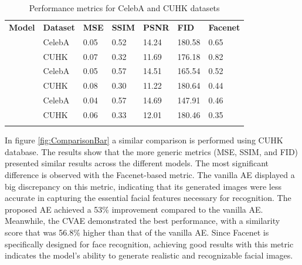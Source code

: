 \documentclass{IEEEcsmag}
\begin{document}
\begin{table}
\vspace*{4pt}
\caption{Performance metrics for CelebA and CUHK datasets}
\label{tab:similarity}
\tablefont
\begin{tabular*}{\textwidth}{@{}l p{40pt}<{\raggedright} p{40pt}<{\centering} p{40pt}<{\centering} p{40pt}<{\centering} p{40pt}<{\centering} p{40pt}<{\centering}@{}}
\toprule
\textbf{Model} & 
\textbf{Dataset} & 
\textbf{MSE} & 
\textbf{SSIM} & 
\textbf{PSNR} & 
\textbf{FID} & 
\textbf{Facenet} \\
\colrule
\multirow{2}{*}{Vanilla AE} 
& CelebA & 0.05 & 0.52 & 14.24 & 180.58 & 0.65 \\[3pt]
& CUHK   & 0.07 & 0.32 & 11.69 & 176.18 & 0.82 \\[3pt]
\colrule
\multirow{2}{*}{Proposed AE}
& CelebA & 0.05 & 0.57 & 14.51 & 165.54 & 0.52 \\[3pt]
& CUHK   & 0.08 & 0.30 & 11.22 & 180.64 & 0.44 \\[3pt]
\colrule
\multirow{2}{*}{Proposed CVAE} 
& CelebA & 0.04 & 0.57 & 14.69 & 147.91 & 0.46 \\[3pt]
& CUHK   & 0.06 & 0.33 & 12.01 & 180.46 & 0.35 \\[3pt]
\botrule
\end{tabular*}
\vspace*{8pt}
\end{table}

In figure \ref{fig:ComparisonBar} a similar comparison is performed using CUHK database. The results show that the more generic metrics (MSE, SSIM, and FID) presented similar results across the different models. The most significant difference is observed with the Facenet-based metric. The vanilla AE displayed a big discrepancy on this metric, indicating that its generated images were less accurate in capturing the essential facial features necessary for recognition. The proposed AE achieved a 53\% improvement compared to the vanilla AE. Meanwhile, the CVAE demonstrated the best performance, with a similarity score that was 56.8\% higher than that of the vanilla AE. Since Facenet is specifically designed for face recognition, achieving good results with this metric indicates the model's ability to generate realistic and recognizable facial images. 
\end{document}
